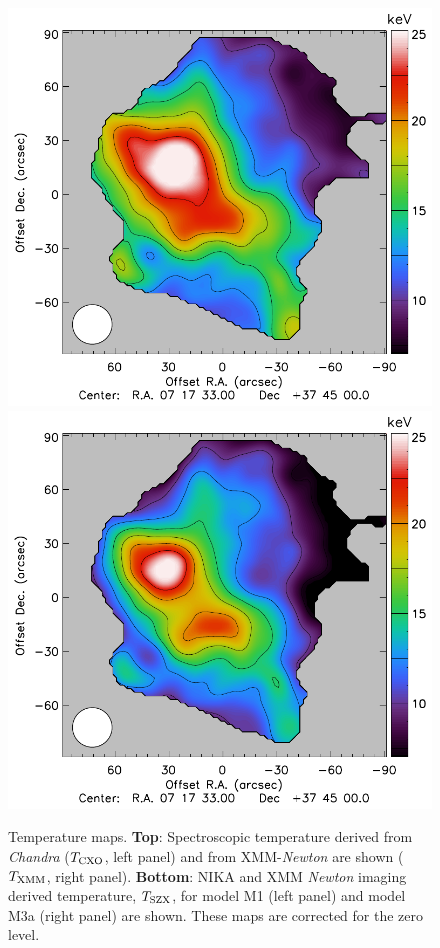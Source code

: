 \documentclass[twocolumn,traditabstract]{aa}
\def\TSZ {T_{\rm SZX}}
\def \TXC {T_{\rm CXO}}
\def \TXX {T_{\rm XMM}}
\begin{document}
\begin{figure}[h]
\includegraphics[trim=0cm 0cm 1.4cm 0cm, clip=true, totalheight=7.6cm]{Figure/Thermo_TSZclean1.pdf}
\includegraphics[trim=0cm 0cm 0cm 0cm, clip=true, totalheight=7.6cm]{Figure/Thermo_TSZclean8.pdf}
\caption{\footnotesize{Temperature maps. {\bf Top}: Spectroscopic temperature derived from \textit{Chandra} ($\TXC$, left panel) and from XMM-\textit{Newton} are shown ($\TXX$, right panel). {\bf Bottom}: NIKA and XMM \textit{Newton} imaging derived temperature, $\TSZ$, for model M1 (left panel) and model M3a (right panel) are shown. These maps are corrected for the zero level.}}
\label{fig:T_maps}
\end{figure}
\end{document}
